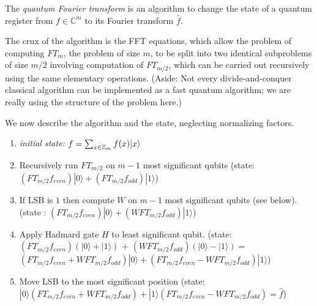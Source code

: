The \emph{quantum Fourier transform} is an algorithm to change the state
of a quantum register from \(f \in \mathbb{C}^m\) to its Fourier
transform \(\hat{f}\).

\hypertarget{quantumftthm}{}

The crux of the algorithm is the FFT equations, which allow the problem
of computing \(\ensuremath{\mathit{FT}}_m\), the problem of size \(m\),
to be split into two identical subproblems of size \(m/2\) involving
computation of \(\ensuremath{\mathit{FT}}_{m/2}\), which can be carried
out recursively using the same elementary operations. (Aside: Not every
divide-and-conquer classical algorithm can be implemented as a fast
quantum algorithm; we are really using the structure of the problem
here.)

We now describe the algorithm and the state, neglecting normalizing
factors.

\begin{enumerate}
\def\labelenumi{\arabic{enumi}.}
\item
  \emph{initial state:} \(f= \sum_{x\in{\mathbb{Z}}_m} f(x)|x\rangle\)
\item
  Recursively run \(\ensuremath{\mathit{FT}}_{m/2}\) on \(m-1\) most
  significant qubits (state:
  \((\ensuremath{\mathit{FT}}_{m/2}f_{even})|0\rangle + (\ensuremath{\mathit{FT}}_{m/2}f_{odd})|1\rangle\))
\item
  If LSB is \(1\) then compute \(W\) on \(m-1\) most significant qubits
  (see below). (state :
  \((\ensuremath{\mathit{FT}}_{m/2}f_{even})|0\rangle + (W \ensuremath{\mathit{FT}}_{m/2}f_{odd})|1\rangle\))
\item
  Apply Hadmard gate \(H\) to least significant qubit. (state:
  \((\ensuremath{\mathit{FT}}_{m/2}f_{even})(|0\rangle+|1\rangle)\)
  \(+\)
  \((W \ensuremath{\mathit{FT}}_{m/2}f_{odd})(|0\rangle-|1\rangle) =\)
  \((\ensuremath{\mathit{FT}}_{m/2}f_{even}+ W \ensuremath{\mathit{FT}}_{m/2}f_{odd})|0\rangle + (\ensuremath{\mathit{FT}}_{m/2}f_{even}-W \ensuremath{\mathit{FT}}_{m/2}f_{odd})|1\rangle\))
\item
  Move LSB to the most significant position (state:
  \(|0\rangle(\ensuremath{\mathit{FT}}_{m/2}f_{even}+ W \ensuremath{\mathit{FT}}_{m/2}f_{odd}) + |1\rangle(\ensuremath{\mathit{FT}}_{m/2}f_{even}- W \ensuremath{\mathit{FT}}_{m/2}f_{odd}) = \hat{f}\))
\end{enumerate}

